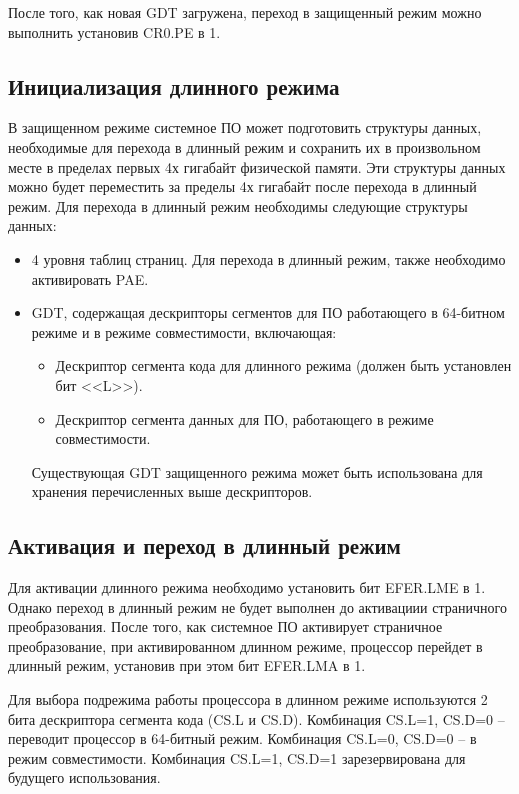 После того, как новая GDT загружена, переход в защищенный режим можно выполнить установив CR0.PE в 1.

\subsection{Инициализация длинного режима}
В защищенном режиме системное ПО может подготовить структуры данных, необходимые для перехода в
длинный режим и сохранить их в произвольном месте в пределах первых 4х гигабайт физической памяти.
Эти структуры данных можно будет переместить за пределы 4х гигабайт после перехода в длинный режим.
Для перехода в длинный режим необходимы следующие структуры данных:
\begin{itemize}
\item 4 уровня таблиц страниц. Для перехода в длинный режим, также необходимо активировать PAE.
\item GDT, содержащая дескрипторы сегментов для ПО работающего в 64-битном режиме и в
	режиме совместимости, включающая:
	\begin{itemize}
	\item Дескриптор сегмента кода для длинного режима (должен быть установлен бит <<L>>).
	\item Дескриптор сегмента данных для ПО, работающего в режиме совместимости.
	\end{itemize}

	Существующая GDT защищенного режима может быть использована для хранения перечисленных
	выше дескрипторов.
\end{itemize}

\subsection{Активация и переход в длинный режим}
Для активации длинного режима необходимо установить бит EFER.LME в 1. Однако переход в длинный режим
не будет выполнен до активациии страничного преобразования. После того, как системное ПО
активирует страничное преобразование, при активированном длинном режиме, процессор перейдет в
длинный режим, установив при этом бит EFER.LMA в 1.

Для выбора подрежима работы процессора в длинном режиме используются 2 бита дескриптора сегмента кода (CS.L и CS.D).
Комбинация CS.L=1, CS.D=0 -- переводит процессор в 64-битный режим. Комбинация CS.L=0, CS.D=0 -- в
режим совместимости. Комбинация CS.L=1, CS.D=1 зарезервирована для будущего использования.

